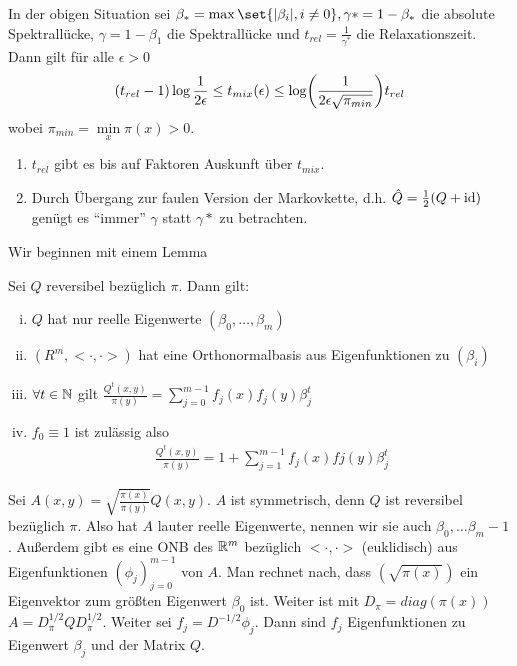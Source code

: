 \begin{satz}
	In der obigen Situation sei $\beta_* = \max\set{\abs{\beta_i},i\neq 0}, \gamma* = 1- \beta_*$ die absolute Spektrallücke, $\gamma = 1 - \beta_1$ die Spektrallücke und $t_{rel} = \frac{1}{\gamma^*}$ die Relaxationszeit. Dann gilt für alle $\epsilon > 0$ 
	\begin{align}
		(t_{rel} - 1) \log \frac{1}{2 \epsilon} \leq t_{mix} (\epsilon) \leq \log\enb{\frac{1}{2\epsilon \sqrt{\pi_{min}}}} t_{rel}
	\end{align}
	wobei $\pi_{min} = \min\limits_{x} \pi(x) > 0$.
\end{satz}
\begin{beweis}
	\begin{enumerate}
		\item $t_{rel}$ gibt es bis auf Faktoren Auskunft über $t_{mix}$.
		\item Durch Übergang zur faulen Version der Markovkette, d.h. $\hat{Q} = \frac{1}{2}(Q + \operatorname{id})$ genügt es \enquote{immer} $\gamma$ statt $\gamma*$ zu betrachten.
	\end{enumerate}
	Wir beginnen mit einem Lemma
	\begin{lemma}
		Sei $Q$ reversibel bezüglich $\pi$. Dann gilt:
		\begin{enumerate}[(i)]
			\item $Q$ hat nur reelle Eigenwerte $(\beta_0,\dots,\beta_m)$
			\item $(R^m,<\cdot,\cdot>)$ hat eine Orthonormalbasis aus Eigenfunktionen zu $(\beta_i)$
			\item $\forall t \in \mathbb{N}$ gilt $\frac{Q^t(x,y)}{\pi(y)}  = \sum\limits_{j = 0}^{m-1} f_j(x) f_j(y)\beta_j^t$
			\item $f_0 \equiv 1$ ist zulässig also \begin{align}
				\frac{Q^t(x,y)}{\pi(y)} = 1+ \sum\limits_{j = 1}^{m-1} f_j(x) fj(y) \beta^t_j
					\end{align}
		\end{enumerate}
	\end{lemma}
	\begin{beweis}
		Sei $A(x,y) = \sqrt{\frac{\pi(x)}{\pi(y)}} Q(x,y).$ $A$ ist symmetrisch, denn $Q$ ist reversibel bezüglich $\pi$. Also hat $A$ lauter reelle Eigenwerte, nennen wir sie auch $\beta_0, \dots \beta_m-1$. Außerdem gibt es eine ONB des $\mathbb{R}^m$ bezüglich $<\cdot,\cdot>$ (euklidisch) aus Eigenfunktionen $(\phi_j)_{j=0}^{m-1}$ von $A$. Man rechnet nach, dass $(\sqrt{\pi(x)})$ ein Eigenvektor zum größten Eigenwert $\beta_0$ ist. Weiter ist mit $D_\pi = diag(\pi(x))$  $A = D^{1/2}_{\pi}  Q D^{1/2}_{\pi}$. Weiter sei $f_j =  D^{-1/2} \phi_j$. Dann sind $f_j$ Eigenfunktionen zu Eigenwert $\beta_j$ und der Matrix $Q$. 

\end{beweis}
\end{beweis}
